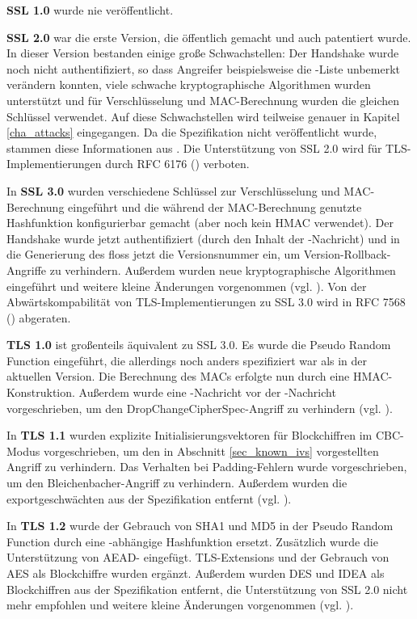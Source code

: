 \textbf{SSL 1.0} wurde nie veröffentlicht.

\textbf{SSL 2.0} war die erste Version, die öffentlich gemacht und auch patentiert wurde. In dieser Version bestanden einige große Schwachstellen: Der Handshake wurde noch nicht authentifiziert, so dass Angreifer beispielsweise die \ciphersuite-Liste unbemerkt verändern konnten, viele schwache kryptographische Algorithmen wurden unterstützt und für Verschlüsselung und MAC-Berechnung wurden die gleichen Schlüssel verwendet. Auf diese Schwachstellen wird teilweise genauer in Kapitel \ref{cha_attacks} eingegangen. Da die Spezifikation nicht veröffentlicht wurde, stammen diese Informationen aus \cite{meyer14}. Die Unterstützung von SSL 2.0 wird für TLS-Implementierungen durch RFC 6176 (\cite{prohibit_ssl20}) verboten.

In \textbf{SSL 3.0} wurden verschiedene Schlüssel zur Verschlüsselung und MAC-Berechnung eingeführt und die während der MAC-Berechnung genutzte Hashfunktion konfigurierbar gemacht (aber noch kein HMAC verwendet). Der Handshake wurde jetzt authentifiziert (durch den Inhalt der \finished{}-Nachricht) und in die Generierung des \premastersecret{} floss jetzt die Versionsnummer ein, um Version-Rollback-Angriffe zu verhindern. Außerdem wurden neue kryptographische Algorithmen eingeführt und weitere kleine Änderungen vorgenommen (vgl. \cite{ssl30}). Von der Abwärtskompabilität von TLS-Implementierungen zu SSL 3.0 wird in RFC 7568 (\cite{deprecate_ssl30}) abgeraten.

\textbf{TLS 1.0} ist großenteils äquivalent zu SSL 3.0. Es wurde die Pseudo Random Function eingeführt, die allerdings noch anders spezifiziert war als in der aktuellen Version. Die Berechnung des MACs erfolgte nun durch eine HMAC-Konstruktion. Außerdem wurde eine \changecipherspec{}-Nachricht vor der \finished{}-Nachricht vorgeschrieben, um den DropChangeCipherSpec-Angriff zu verhindern (vgl. \cite{tls10}).

In \textbf{TLS 1.1} wurden explizite Initialisierungsvektoren für Blockchiffren im CBC-Modus vorgeschrieben, um den in Abschnitt \ref{sec_known_ivs} vorgestellten Angriff zu verhindern. Das Verhalten bei Padding-Fehlern wurde vorgeschrieben, um den Bleichenbacher-Angriff zu verhindern. Außerdem wurden die exportgeschwächten \ciphersuites{} aus der Spezifikation entfernt (vgl. \cite{tls11}).

In \textbf{TLS 1.2} wurde der Gebrauch von SHA1 und MD5 in der Pseudo Random Function durch eine \ciphersuite{}-abhängige Hashfunktion ersetzt. Zusätzlich wurde die Unterstützung von AEAD-\ciphersuites{} eingefügt. TLS-Extensions und der Gebrauch von AES als Blockchiffre wurden ergänzt. Außerdem wurden DES und IDEA als Blockchiffren aus der Spezifikation entfernt, die Unterstützung von SSL 2.0 nicht mehr empfohlen und weitere kleine Änderungen vorgenommen (vgl. \cite{tls12}).

